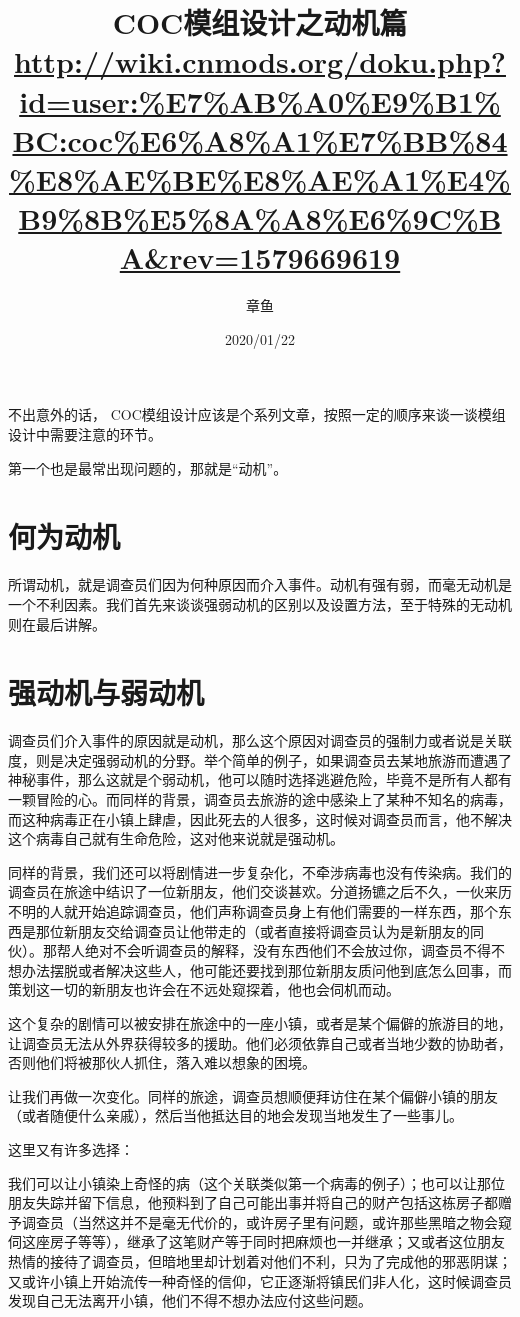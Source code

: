 \documentclass[a4paper,zihao=-4,notitlepage,twoside,openright]{ctexart}
\title{COC模组设计之动机篇\\
{\footnotesize \url{http://wiki.cnmods.org/doku.php?id=user:\%E7\%AB\%A0\%E9\%B1\%BC:coc\%E6\%A8\%A1\%E7\%BB\%84\%E8\%AE\%BE\%E8\%AE\%A1\%E4\%B9\%8B\%E5\%8A\%A8\%E6\%9C\%BA&rev=1579669619}}}
\author{章鱼}
\date{2020/01/22}
\begin{document}
\maketitle

不出意外的话， COC模组设计应该是个系列文章，按照一定的顺序来谈一谈模组设计中需要注意的环节。

第一个也是最常出现问题的，那就是“动机”。

\section{何为动机}

所谓动机，就是调查员们因为何种原因而介入事件。动机有强有弱，而毫无动机是一个不利因素。我们首先来谈谈强弱动机的区别以及设置方法，至于特殊的无动机则在最后讲解。

\section{强动机与弱动机}

调查员们介入事件的原因就是动机，那么这个原因对调查员的强制力或者说是关联度，则是决定强弱动机的分野。举个简单的例子，如果调查员去某地旅游而遭遇了神秘事件，那么这就是个弱动机，他可以随时选择逃避危险，毕竟不是所有人都有一颗冒险的心。而同样的背景，调查员去旅游的途中感染上了某种不知名的病毒，而这种病毒正在小镇上肆虐，因此死去的人很多，这时候对调查员而言，他不解决这个病毒自己就有生命危险，这对他来说就是强动机。

同样的背景，我们还可以将剧情进一步复杂化，不牵涉病毒也没有传染病。我们的调查员在旅途中结识了一位新朋友，他们交谈甚欢。分道扬镳之后不久，一伙来历不明的人就开始追踪调查员，他们声称调查员身上有他们需要的一样东西，那个东西是那位新朋友交给调查员让他带走的（或者直接将调查员认为是新朋友的同伙）。那帮人绝对不会听调查员的解释，没有东西他们不会放过你，调查员不得不想办法摆脱或者解决这些人，他可能还要找到那位新朋友质问他到底怎么回事，而策划这一切的新朋友也许会在不远处窥探着，他也会伺机而动。

这个复杂的剧情可以被安排在旅途中的一座小镇，或者是某个偏僻的旅游目的地，让调查员无法从外界获得较多的援助。他们必须依靠自己或者当地少数的协助者，否则他们将被那伙人抓住，落入难以想象的困境。

让我们再做一次变化。同样的旅途，调查员想顺便拜访住在某个偏僻小镇的朋友（或者随便什么亲戚），然后当他抵达目的地会发现当地发生了一些事儿。

这里又有许多选择：

我们可以让小镇染上奇怪的病（这个关联类似第一个病毒的例子）；也可以让那位朋友失踪并留下信息，他预料到了自己可能出事并将自己的财产包括这栋房子都赠予调查员（当然这并不是毫无代价的，或许房子里有问题，或许那些黑暗之物会窥伺这座房子等等），继承了这笔财产等于同时把麻烦也一并继承；又或者这位朋友热情的接待了调查员，但暗地里却计划着对他们不利，只为了完成他的邪恶阴谋；又或许小镇上开始流传一种奇怪的信仰，它正逐渐将镇民们非人化，这时候调查员发现自己无法离开小镇，他们不得不想办法应付这些问题。
\end{document}
